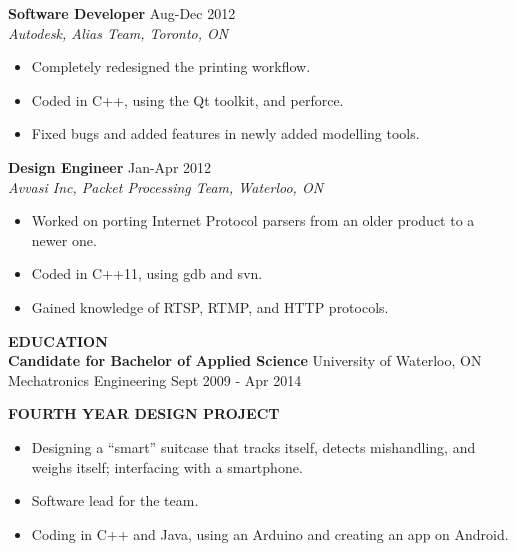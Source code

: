 \documentclass{letter}
\begin{document}
{\bf Software Developer} \hfill Aug-Dec 2012 \\
{\sl Autodesk, Alias Team, Toronto, ON}
\begin{itemize}
\item Completely redesigned the printing workflow.
\item Coded in C++, using the Qt toolkit, and perforce.
\item Fixed bugs and added features in newly added modelling tools.
\end{itemize}

{\bf Design Engineer} \hfill Jan-Apr 2012 \\
{\sl Avvasi Inc, Packet Processing Team, Waterloo, ON}
\begin{itemize}
\item Worked on porting Internet Protocol parsers from an older product to a newer one.
\item Coded in C++11, using gdb and svn.
\item Gained knowledge of RTSP, RTMP, and HTTP protocols.
\end{itemize}

{\large\bf EDUCATION} \\
{\bf Candidate for Bachelor of Applied Science} \hfill University of Waterloo, ON \\
Mechatronics Engineering \hfill Sept 2009 - Apr 2014

{\large\bf FOURTH YEAR DESIGN PROJECT}
\begin{itemize}
\item Designing a ``smart'' suitcase that tracks itself, detects mishandling, and weighs itself; interfacing with a smartphone.
\item Software lead for the team.
\item Coding in C++ and Java, using an Arduino and creating an app on Android.
\end{itemize}
\end{document}
